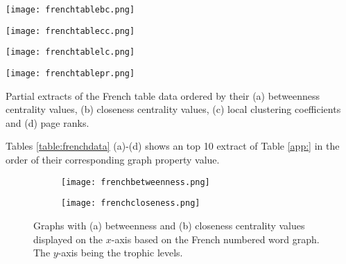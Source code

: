 \begin{table}[!htb]
\centering
\begin{subtable}{.27\textwidth}
	\texttt{[image: frenchtablebc.png]}
	\caption{}
	\label{table:frenchtablebc}
\end{subtable}
\hfill
\begin{subtable}{.2\textwidth}
	\centering
	\texttt{[image: frenchtablecc.png]}
	\caption{}
	\label{table:frenchtablecc}
\end{subtable}
\hfill
\begin{subtable}{.2\textwidth}
	\centering
	\texttt{[image: frenchtablelc.png]}
	\caption{}
	\label{table:frenchtablelc}
\end{subtable}
\hfill
\begin{subtable}{.2\textwidth}
	\centering
	\texttt{[image: frenchtablepr.png]}
	\caption{}
	\label{table:frenchtablepr}
\end{subtable}
\caption{Partial extracts of the French table data ordered by their (a) betweenness centrality values, (b) closeness centrality values, (c) local clustering coefficients and (d) page ranks.}
\label{table:frenchdata}
\end{table}

Tables \ref{table:frenchdata} (a)-(d) shows an top 10 extract of Table \ref{app:} in the order of their corresponding graph property value.

\begin{figure}[!htb]
\centering
\begin{subfigure}{.45\textwidth}
	\hspace{-1cm} 
	\texttt{[image: frenchbetweenness.png]}
	\caption{}
	\label{fig:frbc}
\end{subfigure}
\hfill
\begin{subfigure}{.45\textwidth}
	\hspace{-1cm} 
	\texttt{[image: frenchcloseness.png]}
	\caption{ }
	\label{fig:frcc}
\end{subfigure}
\caption{Graphs with (a) betweenness and (b) closeness centrality values displayed on the $x$-axis based on the French numbered word graph. The $y$-axis being the trophic levels.}
\label{fig:frcentrality}
\end{figure}

